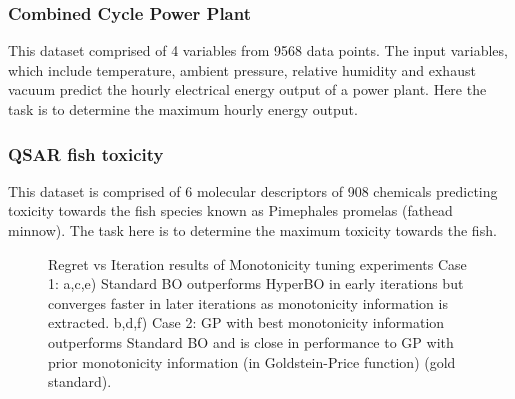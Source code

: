 \subsubsection{Combined Cycle Power Plant}
This dataset comprised of 4 variables from 9568 data points. The input variables, which include temperature, ambient pressure, relative humidity and exhaust vacuum predict  the hourly electrical energy output of a power plant. Here the task is to determine the maximum hourly energy output.

\subsubsection{QSAR fish toxicity}
This dataset is comprised of 6 molecular descriptors of 908 chemicals predicting toxicity towards the fish species known as Pimephales promelas (fathead minnow). The task here is to determine the maximum toxicity towards the fish.

\begin{figure}[t]
	\centering
	\qquad
	\qquad
	\qquad
	\qquad
	\qquad
	\caption{Regret vs Iteration results of Monotonicity tuning experiments Case 1: a,c,e) Standard BO outperforms HyperBO in early iterations but converges faster in later iterations as monotonicity information is extracted. b,d,f) Case 2: GP with best monotonicity information outperforms Standard BO and is close in performance to GP with prior monotonicity information (in Goldstein-Price function) (gold standard).}%
	\label{fig:Monotonicity_experiments}%
\end{figure}

